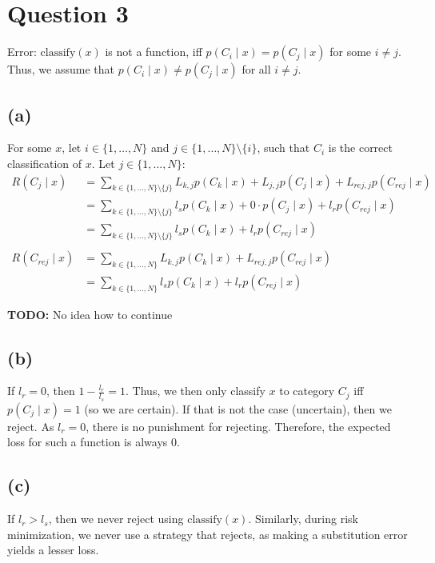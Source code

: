 \section*{Question 3}
Error: $\text{classify}(x)$ is not a function, iff $p(C_i \mid x) = p(C_j \mid x)$ for some $i \neq j$. Thus, we assume that $p(C_i \mid x) \neq p(C_j \mid x)$ for all $i \neq j$.

\subsection*{(a)}
For some $x$, let $i \in \{1, \dots, N\}$ and $j \in \{1, \dots, N\} \setminus \{i\}$, such that $C_i$ is the correct classification of $x$. Let $j \in \{1, \dots, N\}$:
\begin{align*}
	R(C_j \mid x) &= \sum_{k \in \{1, \dots, N\} \setminus \{j\}} L_{k,j} p(C_k \mid x) + L_{j,j} p(C_j \mid x) + L_{rej,j} p(C_{rej} \mid x) \\
	&= \sum_{k \in \{1, \dots, N\} \setminus \{j\}} l_s p(C_k \mid x) + 0 \cdot p(C_j \mid x) + l_r p(C_{rej} \mid x) \\
	&= \sum_{k \in \{1, \dots, N\} \setminus \{j\}} l_s p(C_k \mid x) + l_r p(C_{rej} \mid x) \\\\
	R(C_{rej} \mid x) &= \sum_{k \in \{1, \dots, N\}} L_{k,j} p(C_k \mid x) + L_{rej,j} p(C_{rej} \mid x) \\
	&= \sum_{k \in \{1, \dots, N\}} l_s p(C_k \mid x) + l_r p(C_{rej} \mid x)
\end{align*}

\textbf{TODO:} No idea how to continue

\subsection*{(b)}
If $l_r=0$, then $1-\frac{l_r}{l_s} = 1$. Thus, we then only classify $x$ to category $C_j$ iff $p(C_j \mid x) = 1$ (so we are certain). If that is not the case (uncertain), then we reject. As $l_r=0$, there is no punishment for rejecting. Therefore, the expected loss for such a function is always $0$.

\subsection*{(c)}
If $l_r>l_s$, then we never reject using $\text{classify}(x)$. Similarly, during risk minimization, we never use a strategy that rejects, as making a substitution error yields a lesser loss.